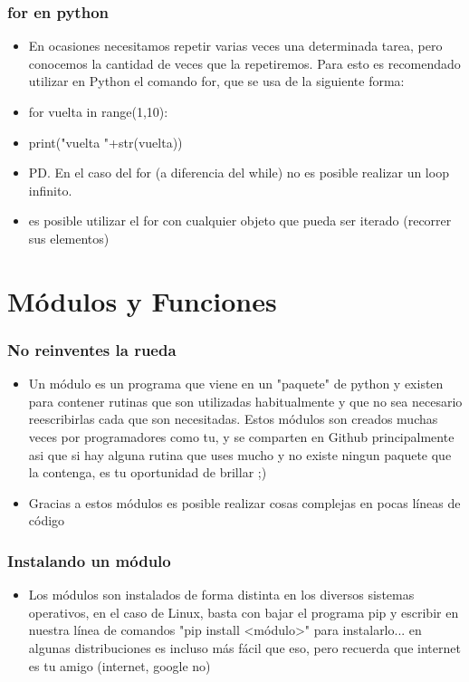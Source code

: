 \documentclass[hyperref={pdfpagelabels=false},xcolor=pst,pdf,fragile]{beamer}
\begin{document}
\begin{frame}
    \frametitle{for en python}
    \pause
    \begin{itemize}
    \item En ocasiones necesitamos repetir varias veces una determinada tarea, pero conocemos la cantidad de veces que la repetiremos. Para esto es recomendado utilizar en Python el comando for, que se usa de la siguiente forma:
    \item for vuelta in range(1,10):
    \item \quad \quad \quad print("vuelta "+str(vuelta))
    \item PD. En el caso del for (a diferencia del while) no es posible realizar un loop infinito.
    \item es posible utilizar el for con cualquier objeto que pueda ser iterado (recorrer sus elementos)
    \end{itemize}
\end{frame}

\section{Módulos y Funciones}

\begin{frame}
    \frametitle{No reinventes la rueda}
    \pause
    \begin{itemize}
    \item Un módulo es un programa que viene en un "paquete" de python y existen para contener rutinas que son utilizadas habitualmente y que no sea necesario reescribirlas cada que son necesitadas. Estos módulos son creados muchas veces por programadores como tu, y se comparten en Github principalmente asi que si hay alguna rutina que uses mucho y no existe ningun paquete que la contenga, es tu oportunidad de brillar ;)
    \item Gracias a estos módulos es posible realizar cosas complejas en pocas líneas de código
    \end{itemize}
\end{frame}

\begin{frame}
    \frametitle{Instalando un módulo}
    \pause
    \begin{itemize}
    \item Los módulos son instalados de forma distinta en los diversos sistemas operativos, en el caso de Linux, basta con bajar el programa pip y escribir en nuestra línea de comandos "pip install \textless módulo\textgreater " para instalarlo... en algunas distribuciones es incluso más fácil que eso, pero recuerda que internet es tu amigo (internet, google no)
    \end{itemize}
\end{frame}
\end{document}
